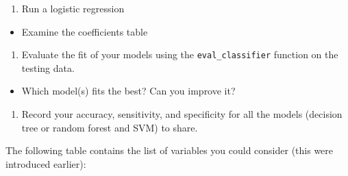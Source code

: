 \documentclass[]{book}
\providecommand{\tightlist}{%
  \setlength{\itemsep}{0pt}\setlength{\parskip}{0pt}}
\begin{document}
\begin{enumerate}
\def\labelenumi{\arabic{enumi}.}
\setcounter{enumi}{3}
\tightlist
\item
  Run a logistic regression
\end{enumerate}

\begin{itemize}
\tightlist
\item
  Examine the coefficients table
\end{itemize}

\begin{enumerate}
\def\labelenumi{\arabic{enumi}.}
\setcounter{enumi}{4}
\tightlist
\item
  Evaluate the fit of your models using the \texttt{eval\_classifier} function on the testing data.
\end{enumerate}

\begin{itemize}
\tightlist
\item
  Which model(s) fits the best? Can you improve it?
\end{itemize}

\begin{enumerate}
\def\labelenumi{\arabic{enumi}.}
\setcounter{enumi}{5}
\tightlist
\item
  Record your accuracy, sensitivity, and specificity for all the models (decision tree or random forest and SVM) to share.
\end{enumerate}

The following table contains the list of variables you could consider (this were introduced earlier):
\end{document}
